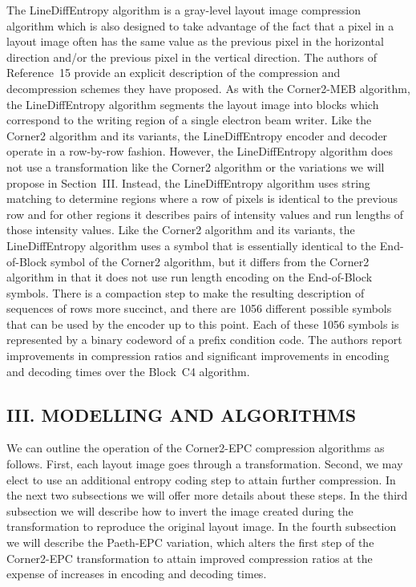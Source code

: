 \documentclass{article}
\begin{document}
The LineDiffEntropy algorithm is a gray-level layout image
compression algorithm which is also designed to take advantage of the
fact that a pixel in a layout image often has the same value as the previous
pixel in the horizontal direction and/or the previous pixel in the 
vertical direction.  The authors of Reference~15 provide an explicit
description of the compression and decompression schemes they have proposed.
As with the Corner2-MEB algorithm, the LineDiffEntropy algorithm segments the
layout image into blocks which correspond to the writing region of a single
electron beam writer.
Like the Corner2 algorithm and its variants, the LineDiffEntropy encoder and
decoder operate in a row-by-row fashion.  However, the LineDiffEntropy 
algorithm does not use a transformation like the Corner2 algorithm or the
variations we will propose in Section~III.  Instead, the LineDiffEntropy 
algorithm uses string matching to determine regions where a row of pixels
is identical to the previous row and for other regions it describes pairs
of intensity values and run lengths of those intensity values.  Like the
Corner2 algorithm and its variants, the LineDiffEntropy algorithm uses a
symbol that is essentially identical to the End-of-Block symbol of 
the Corner2 algorithm, but it differs from the Corner2 algorithm in that
it does not use run length encoding on the End-of-Block symbols.
There is a compaction step to make the resulting description of sequences
of rows more succinct, and there are 1056 different possible symbols 
that can be used by the encoder up to this point.  Each of these 1056
symbols is represented by a binary codeword of a prefix condition code.
The authors report improvements in compression ratios and significant
improvements in encoding and decoding times over the Block~C4 algorithm. 

\subsection*{III. MODELLING AND ALGORITHMS}
We can outline the operation of the Corner2-EPC compression algorithms as 
follows.  First, each layout image goes through a transformation.  Second, 
we may elect to use an additional entropy coding step to attain further
compression.  In the next two subsections we will offer more details
about these steps.  In the third subsection we will describe how to invert
the image created during the transformation to reproduce the original layout
image.  In the fourth subsection we will describe the Paeth-EPC variation, 
which alters the first step of the Corner2-EPC transformation to attain 
improved compression ratios at
the expense of increases in encoding and decoding times.
\end{document}
